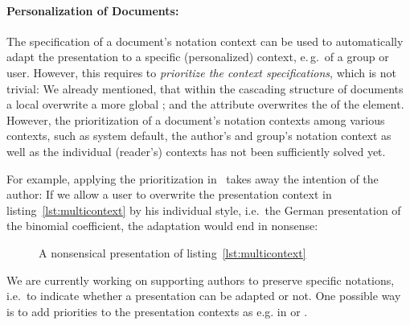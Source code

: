 \documentclass[a4paper]{article}
\begin{document}
\paragraph{Personalization of Documents:} The specification of a document's notation
context can be used to automatically adapt the presentation to a specific (personalized)
context, e.\,g.\ of a group or user. However, this requires to {\emph{prioritize the
    context specifications}}, which is not trivial: We already mentioned, that within the
cascading structure of documents a local {} overwrite a more global
{}; and the {} attribute overwrites the
{} of the {} element. However, the prioritization of a
document's notation contexts among various contexts, such as system default, the author's
and group's notation context as well as the individual (reader's) contexts has not been
sufficiently solved yet.

For example, applying the prioritization in~\cite{ManLib:apo05} takes away the intention
of the author: If we allow a user to overwrite the presentation context in
listing~\ref{lst:multicontext} by his individual style, i.e.\ the German presentation of
the binomial coefficient, the adaptation would end in nonsense:

\begin{figure}[ht]
\begin{center}
\caption{A nonsensical presentation of listing~\ref{lst:multicontext}}
\end{center}
\end{figure}
We are currently working on supporting authors to preserve specific
notations, i.e.\ to indicate whether a presentation can be adapted or not. One possible
way is to add priorities to the presentation contexts as e.g. in {\css} or {\xslt}.


\end{document}
